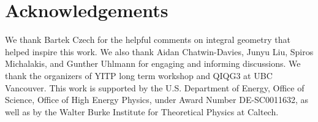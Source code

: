 \documentclass[%
12pt,preprint,
nofootinbib,
amsmath,amssymb,
aps,
prd,
showpacs,
superscriptaddress
]{revtex4-2}
\begin{document}
\section*{Acknowledgements}
We thank Bartek Czech for the helpful comments on integral geometry that helped inspire this work. We also thank Aidan Chatwin-Davies, Junyu Liu, Spiros Michalakis, and Gunther Uhlmann for engaging and informing discussions. We thank the organizers of YITP long term workshop and QIQG3 at UBC Vancouver. This work is  supported by the U.S. Department of Energy, Office of Science, Office of High Energy Physics, under Award Number DE-SC0011632, as well as by the Walter Burke Institute for Theoretical Physics at Caltech.




\end{document}
